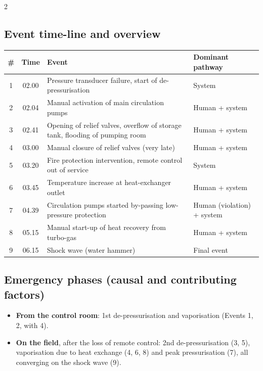 \begin{multicols}{2}
\columnbreak
\subsection{Event time-line and overview}
\renewcommand{\arraystretch}{1.18}
\begin{tabularx}{\linewidth}{c c X l}
  \toprule
  \textbf{\#} & \textbf{Time} & \textbf{Event} & \textbf{Dominant pathway}\\
  \midrule
  1 & 02.00 & Pressure transducer failure, start of de-pressurisation & System\\
  2 & 02.04 & Manual activation of main circulation pumps & Human + system\\
  3 & 02.41 & Opening of relief valves, overflow of storage tank, flooding of pumping room & Human + system\\
  4 & 03.00 & Manual closure of relief valves (very late) & Human + system\\
  5 & 03.20 & Fire protection intervention, remote control out of service & System\\
  6 & 03.45 & Temperature increase at heat-exchanger outlet & Human + system\\
  7 & 04.39 & Circulation pumps started by-passing low-pressure protection & Human (violation) + system\\
  8 & 05.15 & Manual start-up of heat recovery from turbo-gas & Human + system\\
  9 & 06.15 & Shock wave (water hammer) & Final event\\
  \bottomrule
\end{tabularx}

\vspace{6pt}
\subsection{Emergency phases (causal and contributing factors)}
\begin{itemize}
  \item \textbf{From the control room}: 1st de-pressurisation and vaporisation (Events 1, 2, with 4).
  \item \textbf{On the field}, after the loss of remote control: 2nd de-pressurisation (3, 5), vaporisation due to heat exchange (4, 6, 8) and peak pressurisation (7), all converging on the shock wave (9).
\end{itemize}
\end{multicols}
